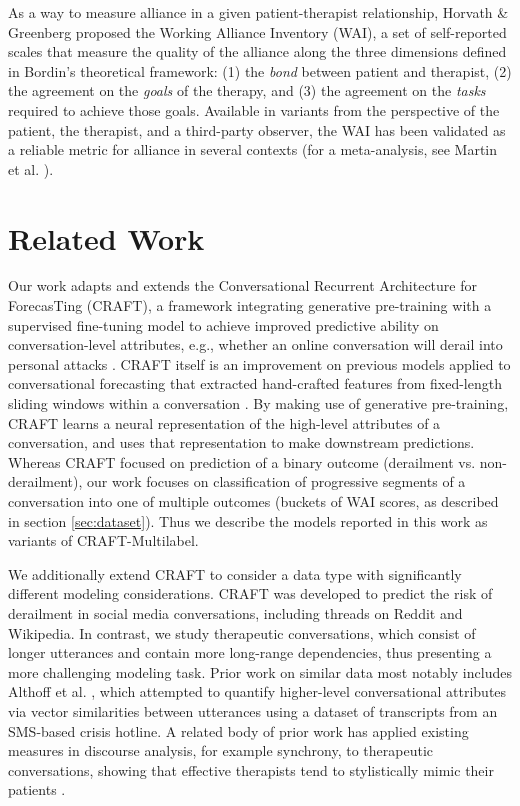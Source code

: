 \documentclass{article}
\newcommand{\fixme}[1]{\textcolor{red}{[FIXME: #1]}}
\begin{document}
As a way to measure alliance in a given patient-therapist relationship, Horvath \& Greenberg \citeyear{horvath1989development} proposed the Working Alliance Inventory (WAI), a set of self-reported scales that measure the quality of the alliance along the three dimensions defined in Bordin's theoretical framework: (1) the \textit{bond} between patient and therapist, (2) the agreement on the \textit{goals} of the therapy, and (3) the agreement on the \textit{tasks} required to achieve those goals. Available in variants from the perspective of the patient, the therapist, and a third-party observer, the WAI has been validated as a reliable metric for alliance in several contexts (for a meta-analysis, see Martin et al. \citeyear{martin2000relation}).

\section{Related Work}
\label{sec:related-work}


Our work adapts and extends the Conversational Recurrent Architecture for ForecasTing (CRAFT), a framework integrating generative pre-training with a supervised fine-tuning model to achieve improved predictive ability on conversation-level attributes, e.g., whether an online conversation will derail into personal attacks \cite{Chang-Trouble:19}. CRAFT itself is an improvement on previous models applied to conversational forecasting that extracted hand-crafted features from fixed-length sliding windows within a conversation \cite{zhang2018conversations}. By making use of generative pre-training, CRAFT learns a neural representation of the high-level attributes of a conversation, and uses that representation to make downstream predictions. Whereas CRAFT focused on prediction of a binary outcome (derailment vs. non-derailment), our work focuses on classification of progressive segments of a conversation into one of multiple outcomes (buckets of WAI scores, as described in section \ref{sec:dataset}). Thus we describe the models reported in this work as variants of CRAFT-Multilabel.

We additionally extend CRAFT to consider a data type with significantly different modeling considerations. CRAFT was developed to predict the risk of derailment in social media conversations, including threads on Reddit and Wikipedia. In contrast, we study therapeutic conversations, which consist of longer utterances and contain more long-range dependencies, thus presenting a more challenging modeling task. Prior work on similar data most notably includes Althoff et al. \citeyear{althoff2016large}, which attempted to quantify higher-level conversational attributes via vector similarities between utterances using a dataset of transcripts from an SMS-based crisis hotline. A related body of prior work has applied existing measures in discourse analysis, for example synchrony, to therapeutic conversations, showing that effective therapists tend to stylistically mimic their patients \cite{dore2018linguistic}.
\end{document}
